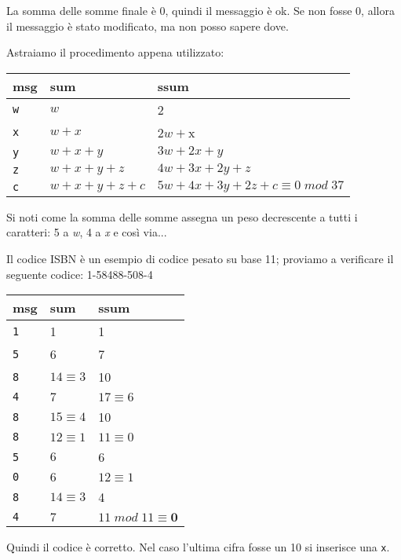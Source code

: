 La somma delle somme finale è 0, quindi il messaggio è ok. Se non fosse 0, allora il messaggio è stato modificato, ma non posso sapere dove.

Astraiamo il procedimento appena utilizzato:

\begin{table}[H]
	\centering
	\begin{tabular}{l|l|l}
		msg & sum & ssum   \\
		\hline
		\texttt{w}  & $w$   & 2      \\
		\texttt{x}  & $w+x$  & $2w+$x     \\
		\texttt{y}  & $w+x+y$ & $3w+2x+y$    \\
		\texttt{z}  & $w+x+y+z$  & $4w+3x+2y+z$ \\
		\texttt{c}  & $w+x+y+z+c$  & $5w+4x+3y+2z+c \equiv 0 \; mod \; 37$ 
	\end{tabular}
\end{table}

Si noti come la somma delle somme assegna un peso decrescente a tutti i caratteri: 5 a \textit{w}, 4 a \textit{x} e così via...

Il codice ISBN è un esempio di codice pesato su base 11; proviamo a verificare il seguente codice: 1-58488-508-4

\begin{table}[H]
	\centering
	\begin{tabular}{l|l|l}
		msg & sum & ssum   \\
		\hline
		\texttt{1}  & 1   & 1      \\
		\texttt{5}  & 6  & 7     \\
		\texttt{8}  & $14 \equiv 3$ & 10   \\
		\texttt{4}  & $7$  & $17 \equiv 6$ \\
		\texttt{8}  & $15 \equiv 4$  & 10 \\
		\texttt{8}  & $12 \equiv 1$  & $11 \equiv 0$ \\
		\texttt{5}  & $6$  & 6 \\
		\texttt{0}  & $6$  & $12 \equiv 1$ \\
		\texttt{8}  & $14 \equiv 3$  & 4 \\
		\hline
		\texttt{4}  & $7$  & $11 \; mod \; 11 \equiv \textbf{0}$ \\
	\end{tabular}
\end{table}

Quindi il codice è corretto. Nel caso l'ultima cifra fosse un 10 si inserisce una \texttt{x}.

